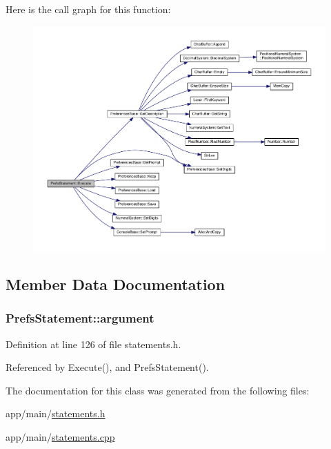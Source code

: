 Here is the call graph for this function\+:
\nopagebreak
\begin{figure}[H]
\begin{center}
\leavevmode
\includegraphics[width=350pt]{dc/daf/classPrefsStatement_ac53922eb842ba389957300fef95cd98f_cgraph}
\end{center}
\end{figure}




\subsection{Member Data Documentation}
\subsubsection[{\texorpdfstring{argument}{argument}}]{ Prefs\+Statement\+::argument\hspace{0.3cm}{\ttfamily [private]}}\hypertarget{classPrefsStatement_a97e5e2a6f13e06ae966bd32afad5ab48}{}\label{classPrefsStatement_a97e5e2a6f13e06ae966bd32afad5ab48}


Definition at line 126 of file statements.\+h.



Referenced by Execute(), and Prefs\+Statement().



The documentation for this class was generated from the following files\+:\begin{DoxyCompactItemize}
\item 
app/main/\hyperlink{statements_8h}{statements.\+h}\item 
app/main/\hyperlink{statements_8cpp}{statements.\+cpp}\end{DoxyCompactItemize}

